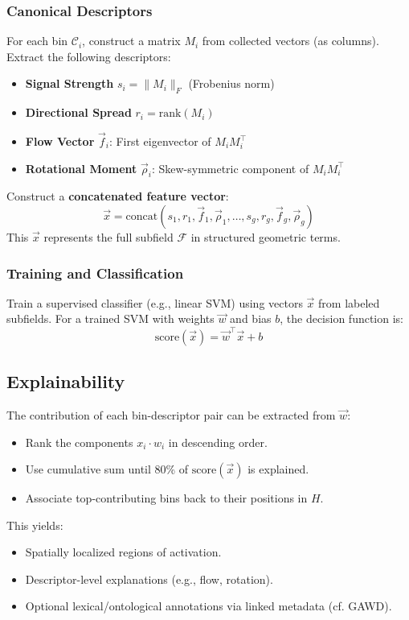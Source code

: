\documentclass{article}
\begin{document}
\subsubsection{Canonical Descriptors}

For each bin $\mathcal{C}_i$, construct a matrix $M_i$ from collected vectors (as columns). Extract the following descriptors:
\begin{itemize}
  \item \textbf{Signal Strength} $s_i = \| M_i \|_F$ (Frobenius norm)
  \item \textbf{Directional Spread} $r_i = \mathrm{rank}(M_i)$
  \item \textbf{Flow Vector} $\vec{f}_i$: First eigenvector of $M_i M_i^\top$
  \item \textbf{Rotational Moment} $\vec{\rho}_i$: Skew-symmetric component of $M_i M_i^\top$
\end{itemize}

Construct a \textbf{concatenated feature vector}:
\[
\vec{x} = \mathrm{concat}(s_1, r_1, \vec{f}_1, \vec{\rho}_1, \dots, s_g, r_g, \vec{f}_g, \vec{\rho}_g)
\]
This $\vec{x}$ represents the full subfield $\mathcal{F}$ in structured geometric terms.

\subsubsection{Training and Classification}

Train a supervised classifier (e.g., linear SVM) using vectors $\vec{x}$ from labeled subfields. For a trained SVM with weights $\vec{w}$ and bias $b$, the decision function is:
\[
\mathrm{score}(\vec{x}) = \vec{w}^\top \vec{x} + b
\]

\subsection{Explainability}

The contribution of each bin-descriptor pair can be extracted from $\vec{w}$:
\begin{itemize}
  \item Rank the components $x_i \cdot w_i$ in descending order.
  \item Use cumulative sum until 80\% of $\mathrm{score}(\vec{x})$ is explained.
  \item Associate top-contributing bins back to their positions in $H$.
\end{itemize}

This yields:
\begin{itemize}
  \item Spatially localized regions of activation.
  \item Descriptor-level explanations (e.g., flow, rotation).
  \item Optional lexical/ontological annotations via linked metadata (cf. GAWD).
\end{itemize}
\end{document}
